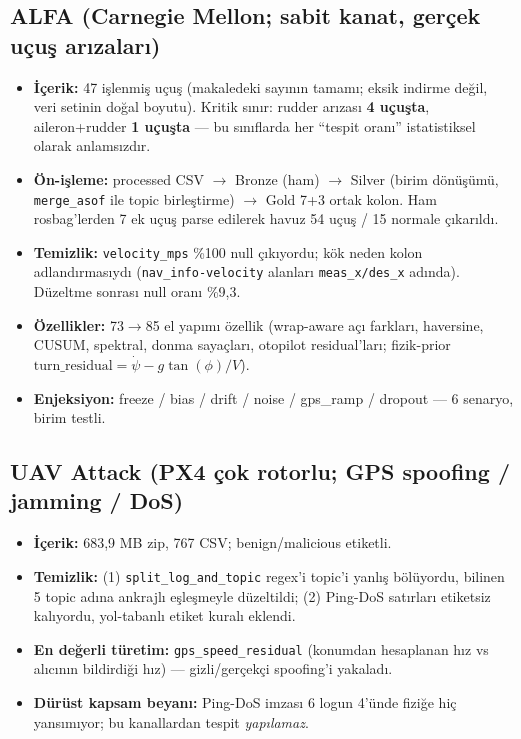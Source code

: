 \documentclass[11pt,a4paper]{article}
\newcommand{\code}[1]{\texttt{\small #1}}
\begin{document}
\subsection{ALFA (Carnegie Mellon; sabit kanat, gerçek uçuş arızaları)}
\begin{itemize}[leftmargin=1.2em,itemsep=1pt]
  \item \textbf{İçerik:} 47 işlenmiş uçuş (makaledeki sayının tamamı; eksik indirme
  değil, veri setinin doğal boyutu). Kritik sınır: rudder arızası \textbf{4 uçuşta},
  aileron+rudder \textbf{1 uçuşta} --- bu sınıflarda her ``tespit oranı''
  istatistiksel olarak anlamsızdır.
  \item \textbf{Ön-işleme:} processed CSV $\to$ Bronze (ham) $\to$ Silver (birim
  dönüşümü, \code{merge\_asof} ile topic birleştirme) $\to$ Gold 7+3 ortak kolon.
  Ham rosbag'lerden 7 ek uçuş parse edilerek havuz 54 uçuş / 15 normale çıkarıldı.
  \item \textbf{Temizlik:} \code{velocity\_mps} \%100 null çıkıyordu; kök neden kolon
  adlandırmasıydı (\code{nav\_info-velocity} alanları \code{meas\_x/des\_x} adında).
  Düzeltme sonrası null oranı \%9{,}3.
  \item \textbf{Özellikler:} 73$\to$85 el yapımı özellik (wrap-aware açı farkları,
  haversine, CUSUM, spektral, donma sayaçları, otopilot residual'ları; fizik-prior
  $\mathrm{turn\_residual} = \dot\psi - g\tan(\phi)/V$).
  \item \textbf{Enjeksiyon:} freeze / bias / drift / noise / gps\_ramp / dropout ---
  6 senaryo, birim testli.
\end{itemize}

\subsection{UAV Attack (PX4 çok rotorlu; GPS spoofing / jamming / DoS)}
\begin{itemize}[leftmargin=1.2em,itemsep=1pt]
  \item \textbf{İçerik:} 683{,}9 MB zip, 767 CSV; benign/malicious etiketli.
  \item \textbf{Temizlik:} (1) \code{split\_log\_and\_topic} regex'i topic'i yanlış
  bölüyordu, bilinen 5 topic adına ankrajlı eşleşmeyle düzeltildi; (2) Ping-DoS
  satırları etiketsiz kalıyordu, yol-tabanlı etiket kuralı eklendi.
  \item \textbf{En değerli türetim:} \code{gps\_speed\_residual} (konumdan hesaplanan
  hız vs alıcının bildirdiği hız) --- gizli/gerçekçi spoofing'i yakaladı.
  \item \textbf{Dürüst kapsam beyanı:} Ping-DoS imzası 6 logun 4'ünde fiziğe hiç
  yansımıyor; bu kanallardan tespit \emph{yapılamaz}.
\end{itemize}
\end{document}
